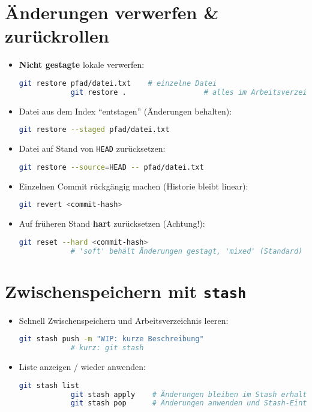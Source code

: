 \documentclass[a4paper,11pt]{article}
\begin{document}
	\section{\"Anderungen verwerfen \& zur\"uckrollen}
	\begin{itemize}
		\item \textbf{Nicht gestagte} lokale  verwerfen:
		\begin{lstlisting}[language=bash]
			git restore pfad/datei.txt    # einzelne Datei
			git restore .                  # alles im Arbeitsverzeichnis
		\end{lstlisting}
		\item Datei aus dem Index \enquote{entstagen} (\"Anderungen behalten):
		\begin{lstlisting}[language=bash]
			git restore --staged pfad/datei.txt
		\end{lstlisting}
		\item Datei auf Stand von \texttt{HEAD} zur\"ucksetzen:
		\begin{lstlisting}[language=bash]
			git restore --source=HEAD -- pfad/datei.txt
		\end{lstlisting}
		\item Einzelnen Commit r\"uckg\"angig machen (Historie bleibt linear):
		\begin{lstlisting}[language=bash]
			git revert <commit-hash>
		\end{lstlisting}
		\item Auf fr\"uheren Stand \textbf{hart} zur\"ucksetzen (Achtung!):
		\begin{lstlisting}[language=bash]
			git reset --hard <commit-hash>
			# 'soft' behält Änderungen gestagt, 'mixed' (Standard) behält sie ungestagt
		\end{lstlisting}
	\end{itemize}
	
	\section{Zwischenspeichern mit \texttt{stash}}
	\begin{itemize}
		\item Schnell Zwischenspeichern und Arbeitsverzeichnis leeren:
		\begin{lstlisting}[language=bash]
			git stash push -m "WIP: kurze Beschreibung"
			# kurz: git stash
		\end{lstlisting}
		\item Liste anzeigen / wieder anwenden:
		\begin{lstlisting}[language=bash]
			git stash list
			git stash apply    # Änderungen bleiben im Stash erhalten
			git stash pop      # Änderungen anwenden und Stash-Eintrag entfernen
		\end{lstlisting}
	\end{itemize}
	
\end{document}
